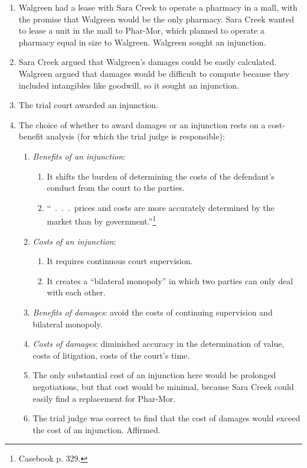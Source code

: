 \begin{enumerate}
    \item Walgreen had a lease with Sara Creek to operate a pharmacy in a 
    mall, with the promise that Walgreen would be the only pharmacy. Sara 
    Creek wanted to lease a unit in the mall to Phar-Mor, which planned to 
    operate a pharmacy equal in size to Walgreen. Walgreen sought an 
    injunction.
    \item Sara Creek argued that Walgreen's damages could be easily 
    calculated. Walgreen argued that damages would be difficult to compute 
    because they included intangibles like goodwill, so it sought an 
    injunction.
    \item The trial court awarded an injunction.
    \item The choice of whether to award damages or an injunction rests on a 
    cost-benefit analysis (for which the trial judge is responsible):
    \begin{enumerate}
        \item \emph{Benefits of an injunction}:
        \begin{enumerate}
            \item It shifts the burden of determining the costs of the 
            defendant's conduct from the court to the parties.
            \item ``~.~.~.~prices and costs are more accurately determined by 
            the market than by government.''\footnote{Casebook p. 329.}
        \end{enumerate}
        \item \emph{Costs of an injunction}:
        \begin{enumerate}
            \item It requires continuous court supervision.
            \item It creates a ``bilateral monopoly'' in which two parties can 
            only deal with each other.
        \end{enumerate}
        \item \emph{Benefits of damages}: avoid the costs of continuing 
        supervision and bilateral monopoly.
        \item \emph{Costs of damages}: diminished accuracy in the 
        determination of value, costs of litigation, costs of the court's 
        time.
        \item The only substantial cost of an injunction here would be 
        prolonged negotiations, but that cost would be minimal, because Sara 
        Creek could easily find a replacement for Phar-Mor.
        \item The trial judge was correct to find that the cost of damages 
        would exceed the cost of an injunction. Affirmed.
    \end{enumerate}
\end{enumerate}

